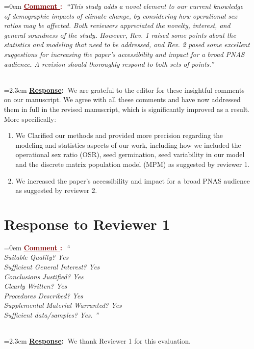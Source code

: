 \documentclass[12pt]{article}
\newcounter{cN}
\newcommand{\comment}[1]{
	\vspace{2em}
	\refstepcounter{cN} %
	\noindent \hangindent=0em \textbf{\textcolor{Maroon}{\uline{Comment \thecN}:~}}\emph{``#1''}
	}
\newcommand{\response}[1]{
	\\[0.25em]
	\hangindent=2.3em \textbf{\textcolor{NavyBlue}{\uline{Response}:~}}#1
	}
\begin{document}
\comment{This study adds a novel element to our current knowledge of demographic impacts of climate change, by considering how operational sex ratios may be affected. Both reviewers appreciated the novelty, interest, and general soundness of the study. However, Rev. 1 raised some points about the statistics and modeling that need to be addressed, and Rev. 2 posed some excellent suggestions for increasing the paper's accessibility and impact for a broad PNAS audience. A revision should thoroughly respond to both sets of points.}
\response{We are grateful to  the editor for these  insightful comments on our manuscript. 
We agree with all these comments and have now addressed them in full in the revised manuscript, which is significantly improved as a result. 
More   specifically:
\begin{enumerate}
	\item We Clarified our methods and provided more precision regarding the modeling and statistics aspects of our work, including how we included the operational sex ratio (OSR), seed germination, seed variability in our model and the discrete matrix population model (MPM) as suggested by reviewer 1.
	\item We increased the paper’s accessibility and impact for a broad PNAS audience as suggested by reviewer 2.
\end{enumerate}
}

\section{Response to Reviewer 1}
\vspace{-2em}

\comment{
\\
Suitable Quality? Yes
\\
Sufficient General Interest? Yes
\\
Conclusions Justified? Yes
\\
Clearly Written? Yes
\\
Procedures Described? Yes
\\
Supplemental Material Warranted? Yes
\\
Sufficient data/samples? Yes.
}
\response{We thank Reviewer 1 for this  evaluation.}
\end{document}
